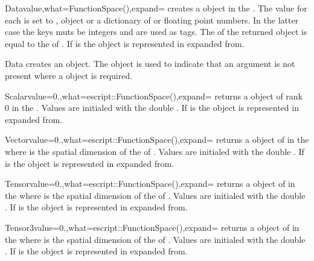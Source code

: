 \begin{classdesc}{Data}{value,what=FunctionSpace(),expand=\False}
creates a \Data object in the \FunctionSpace {}. 
The value for each \DataSamplePoints is set to \numarray, \Data object  or a dictionary of 
\numarray or floating point numbers. In the latter case the keys muts be integers and are used
as tags.
The \Shape of the returned object is equal to the \Shape of . If  is \True
the \Data object is represented in expanded from.
\end{classdesc}

\begin{classdesc}{Data}{}
creates an \EmptyData object. The \EmptyData object is used to indicate that an argument is not present
where a \Data object is required.
\end{classdesc}

\begin{funcdesc}{Scalar}{value=0.,what=escript::FunctionSpace(),expand=\False}
returns a \Data object of rank 0 in the \FunctionSpace {}.
Values are initialed with the double . If  is \True
the \Data object is represented in expanded from.
\end{funcdesc}

\begin{funcdesc}{Vector}{value=0.,what=escript::FunctionSpace(),expand=\False}
returns a \Data object of \Shape {} in the \FunctionSpace {} 
where  is the spatial dimension of the \Domain of .
Values are initialed with the double . If  is \True
the \Data object is represented in expanded from.
\end{funcdesc}

\begin{funcdesc}{Tensor}{value=0.,what=escript::FunctionSpace(),expand=\False}
returns a \Data object of \Shape {} in the \FunctionSpace {} 
where  is the spatial dimension of the \Domain of .
Values are initialed with the double . If  is \True
the \Data object is represented in expanded from.
\end{funcdesc}

\begin{funcdesc}{Tensor3}{value=0.,what=escript::FunctionSpace(),expand=\False}
returns a \Data object of \Shape {} in the \FunctionSpace {} 
where  is the spatial dimension of the \Domain of .
Values are initialed with the double . If  is \True
the \Data object is represented in expanded from.
\end{funcdesc}

